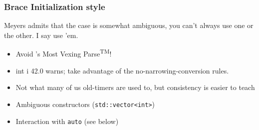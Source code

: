 
\begin{frame}[fragile,t]
\frametitle{Brace Initialization style}
Meyers admits that the case is somewhat ambiguous, you can't always
use one or the other.  I say use 'em.

\begin{itemize}
\item Avoid \CC's Most Vexing Parse\textsuperscript{TM}!
\item int i {42.0} warns; take advantage of the
  no-narrowing-conversion rules.
\item Not what many of us old-timers are used to, but consistency is
  easier to teach
\end{itemize}

\begin{itemize}
\item Ambiguous constructors (\texttt{std::vector<int>})
\item Interaction with \texttt{auto} (see below)
\end{itemize}



\end{frame}


